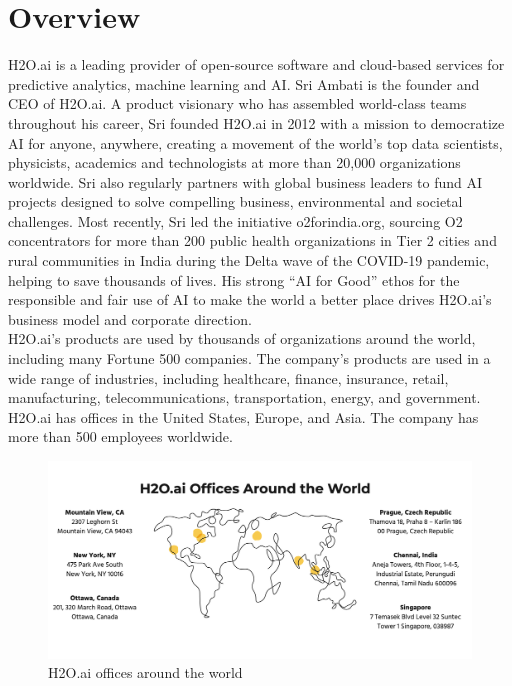 \documentclass[12pt,a4paper]{report}
\begin{document}
\section{Overview}
H2O.ai is a leading provider of open-source software and cloud-based services for predictive analytics, machine learning and \ac{AI}. Sri Ambati is the founder and CEO of H2O.ai. A product visionary who has assembled world-class teams throughout his career, Sri founded H2O.ai in 2012 with a mission to democratize AI for anyone, anywhere, creating a movement of the world's top data scientists, physicists, academics and technologists at more than 20,000 organizations worldwide. Sri also regularly partners with global business leaders to fund AI projects designed to solve compelling business, environmental and societal challenges. Most recently, Sri led the initiative o2forindia.org, sourcing O2 concentrators for more than 200 public health organizations in Tier 2 cities and rural communities in India during the Delta wave of the COVID-19 pandemic, helping to save thousands of lives. His strong “AI for Good” ethos for the responsible and fair use of AI to make the world a better place drives H2O.ai's business model and corporate direction. \\
H2O.ai's products are used by thousands of organizations around the world, including many Fortune 500 companies. The company's products are used in a wide range of industries, including healthcare, finance, insurance, retail, manufacturing, telecommunications, transportation, energy, and government. \\

H2O.ai has offices in the United States, Europe, and Asia. The company has more than 500 employees worldwide. \\

\begin{figure}[htbp]
\centering
\includegraphics[width=1\textwidth]{h2oaimap.png}
\caption{H2O.ai offices around the world}
\end{figure}
\end{document}

